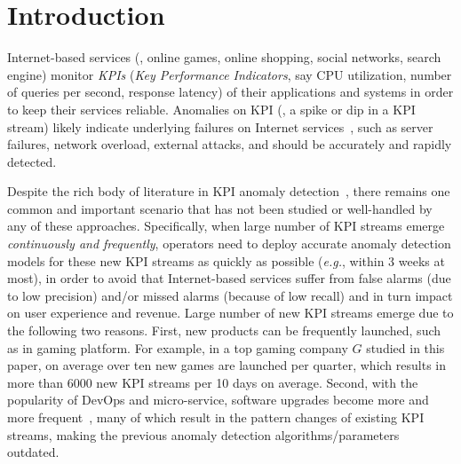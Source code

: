 \section{Introduction}
\label{sec:introduction}

Internet-based services (\EG, online games, online shopping, social networks, search engine) monitor 
 \textit{KPIs} (\textit{Key Performance Indicators}, say CPU utilization, number of queries per second, response latency) of  their applications and systems in order to keep their services reliable.  
Anomalies on KPI (\EG, a spike or dip in a KPI stream) likely indicate underlying failures on Internet services~\cite{chen2013provider,liu2015opprentice,zhang2015rapid,ma2018robust,sun2018hotspot}, such as server failures, network overload, external attacks, and should be accurately and rapidly detected. 


Despite the rich body of literature in KPI anomaly detection~\cite{Mahimkar:2011:RDM:2079296.2079309, barford2002signal, Zhang:2005:NA:1251086.1251116, yan2012argus, egads, liu2015opprentice, ding2013anomaly, xu2018unsupervised}, there remains one common and important scenario that has not been studied or well-handled by any of these approaches. Specifically, when large number of KPI streams emerge \emph{continuously and frequently}, operators need to deploy accurate anomaly detection models for these new KPI streams as quickly as possible (\textit{e.g.}, within 3 weeks at most), in order to avoid that Internet-based services suffer from false alarms (due to low precision) and/or missed alarms (because of low recall) and in turn impact on user experience and revenue. Large number of new KPI streams emerge due to the following two reasons. First, new products can be frequently launched, such as in gaming platform. For example, in a top gaming company $G$ studied in this paper, on average over ten new games are launched per quarter, which results in more than 6000 new KPI streams per 10 days on average. Second, with the popularity of DevOps and micro-service, software upgrades become more and more frequent~\cite{zhang2016funnel}, many of which result in the pattern changes of existing KPI streams, making the previous anomaly detection algorithms/parameters outdated. 

